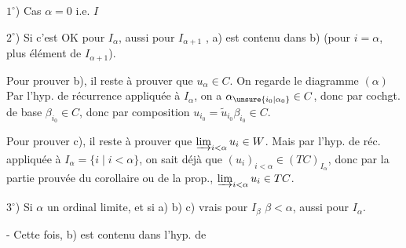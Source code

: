 
$1^\circ$) Cas $\alpha=0$ i.e. $I$  

$2^\circ$) Si c'est OK pour $I_\alpha$, aussi pour $I_{\alpha+1}$ \inserted{$=\{\beta\mid\beta\leq\alpha\}$},   a) est contenu dans b) (pour $i=\alpha$,  plus  élément de $I_{\alpha+1}$).

 
Pour prouver b), il reste à prouver que $u_\alpha\in C$. On regarde le diagramme $(\alpha)$  Par  l'hyp. de récurrence  appliquée à $I_\alpha$, on a $\alpha_{\unsure{i_0|\alpha_0}}\in C$, donc par cochgt. de base $\beta_{i_0}\in C$, donc par composition $u_{i_0}=\widetilde{u}_{i_0}\beta_{i_0}\in C$.

Pour prouver c), il reste à prouver que $\varinjlim_{i<\alpha}u_i\in W$.  Mais par l'hyp. de réc. appliquée à $I_\alpha=\{i\mid i<\alpha\}$, on sait déjà que $(u_i)_{i<\alpha}\in (TC)_{I_\alpha}$, donc par la partie prouvée du corollaire ou de la prop., $\varinjlim_{i<\alpha}u_i\in TC$.

$3^\circ$) Si $\alpha$ un ordinal limite, et si a) b) c) vrais pour $I_\beta$  $\beta<\alpha$, aussi pour $I_\alpha$.

- Cette fois, b) est contenu dans l'hyp. de

